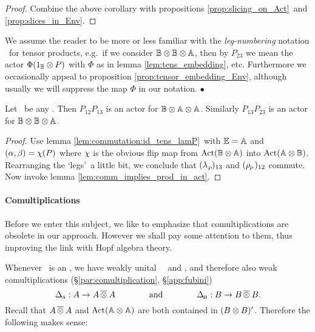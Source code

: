 \begin{proof}
Combine the above corollary with propositions
\ref{prop:slicing_on_Act}\ and \ref{prop:slices_in_Env}\@.
\end{proof}


\begin{notation_sec} \rm
We assume the reader to be more or less familiar with the {\em leg-numbering\/} notation
\cite{BS}\ for tensor products, e.g.\ if we consider $\BB \tens \BB \tens \Aa$,
then by $P_{23}$ we mean the actor $\Phi(1_\BB \tens P)$
with $\Phi$ as in lemma \ref{lem:tens_embedding}, etc.
Further\-more we occasionally appeal to proposition \ref{prop:tensor_embedding_Env},
although usually we will suppress the map $\Phi$ in our notation.
\hfill $\bullet$
\end{notation_sec}



\begin{lemma_sec} \label{lem:P13P23actor}
Let\/ \pairAB\ be any \idpa\@.
Then\/ $P_{12} P_{13}$ is an actor for\/ $\BB \tens \Aa \tens \Aa$.
Similarly\/ $P_{13} P_{23}$ is an actor for\/ $\BB \tens \BB \tens \Aa$.
\end{lemma_sec}

\begin{proof}
Use lemma \ref{lem:commutation:id_tens_lamP}\ with $\EE=\Aa$ and
$(\alpha,\beta) = \flip(P)$ where $\flip$ is the obvious flip map from
$\Act(\BBAA)$ into $\Act(\AABB)$.
Rearranging the \lq legs\rq\ a little bit, we conclude that
$(\lp)_{13}$ and $(\rp)_{12}$ commute.
Now invoke lemma \ref{lem:comm_implies_prod_in_act}.
\end{proof}
\vspace{2ex}



\paragraph{Comultiplications}
Before we enter this subject, we like to emphasize that comultiplications
are obsolete in our approach. However we shall pay some attention to them,
thus improving the link with Hopf algebra theory.

Whenever \pairAB\ is an \idpa, we have weakly unital \contexts\ \Aa\ and \BB, and therefore
also weak comultiplications (\S\ref{par:comultiplication}, \S\ref{app:fubini})
$$  \DeltaA : A \rarr A \fubtens A
                 \andspace{4em}
    \DeltaB : B \rarr B \fubtens B.  $$
Recall that $A \fubtens A$ and $\Act(\AAAA)$ are both contained in $(B \tens B)'$.
Therefore the following makes sense:

